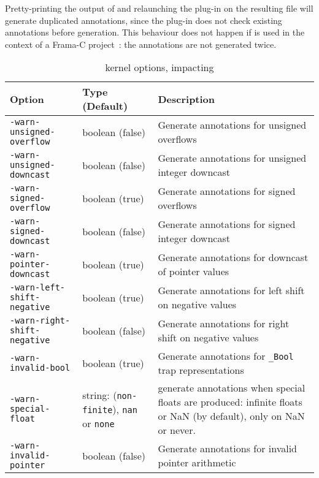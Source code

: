 Pretty-printing the output of \rte{} and relaunching the plug-in on the
resulting file will generate duplicated annotations, since the plug-in does not
check existing annotations before generation. This behaviour does not happen if
\rte{} is used in the context of a Frama-C project~\cite{framacdev}: the
annotations are not generated twice.

\begin{table}
\begin{center}
\begin{tabular}{|l|l|p{4.5cm}|}
\hline
{\bf Option} & {\bf Type (Default)} & {\bf Description} \\
\hline
\lstinline|-warn-unsigned-overflow| & boolean (false) & Generate annotations for
unsigned overflows\\
\hline
\lstinline|-warn-unsigned-downcast| & boolean (false) & Generate annotations for
unsigned integer downcast\\
\hline
\lstinline|-warn-signed-overflow| & boolean (true) & Generate annotations for
signed overflows \\
\hline
\lstinline|-warn-signed-downcast| & boolean (false) & Generate annotations for
signed integer downcast \\
\hline
\lstinline|-warn-pointer-downcast| & boolean (true) & Generate annotations for
downcast of pointer values \\
\hline
\lstinline|-warn-left-shift-negative| & boolean (true) & Generate annotations for
left shift on negative values \\
\hline
\lstinline|-warn-right-shift-negative| & boolean (false) & Generate annotations for
right shift on negative values \\
\hline
\lstinline|-warn-invalid-bool| & boolean (true) & Generate annotations for
\lstinline|_Bool| trap representations \\
\hline
\lstinline|-warn-special-float| &  string: (\lstinline|non-finite|), \lstinline|nan| or \lstinline|none|  & generate annotations when
special floats are produced: infinite floats or NaN (by default), only on NaN or never. \\
\hline
\lstinline|-warn-invalid-pointer| & boolean (false) & Generate annotations for
invalid pointer arithmetic \\
\hline
\end{tabular}
\caption{\framac kernel options, impacting \rte{}} \label{kernel}
\end{center}
\end{table}

